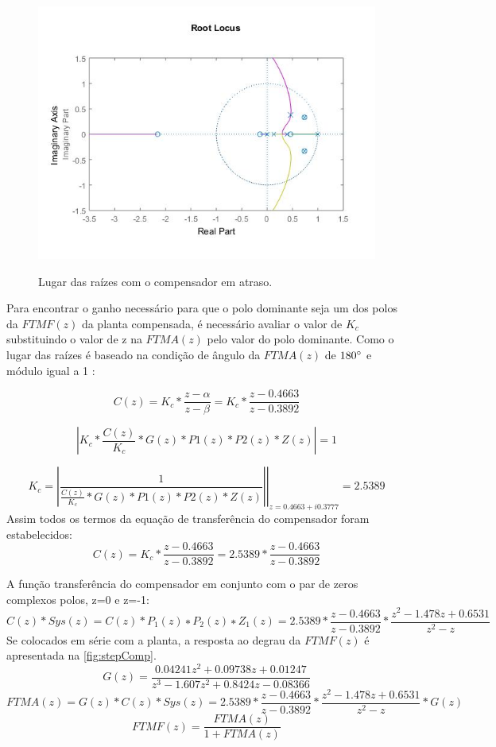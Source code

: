 \documentclass[
	article,			%
	11pt,				%
	oneside,			%
	a4paper,			%
	english,			%
	brazil,				%
	sumario=tradicional
	]{abntex2}
\begin{document}
\begin{figure}[htb!]
	\centering
	\caption{Lugar das raízes com o compensador em atraso.}
	\includegraphics[scale=0.8]{./img/rlocus_compensado.JPG}
	\label{fig:rlocus_compensado}
\end{figure}

Para encontrar o ganho necessário para que o polo dominante seja um dos polos da $FTMF(z)$ da planta compensada, é necessário avaliar o valor de $K_c$ substituindo o valor de z na $FTMA(z)$ pelo valor do polo dominante.
Como o lugar das raízes é baseado na condição de ângulo da $FTMA(z)$ de $180\degree$ e módulo igual a 1 \cite{Ogata2014}:

$$
	C(z) = K_c * \frac{z - \alpha}{z - \beta} = K_c * \frac{z - 0.4663}{z - 0.3892} 
$$

$$
|K_c*\frac{C(z)}{K_c}*G(z)*P1(z)*P2(z)*Z(z)|=1
$$

$$
    K_c  = \left. |\frac{1}{\frac{C(z)}{K_c}*G(z)*P1(z)*P2(z)*Z(z)}| \right\rvert_{z = 0.4663+i0.3777}  = 2.5389
$$
Assim todos os termos da equação de transferência do compensador foram estabelecidos:
$$
	C(z) = K_c * \frac{z - 0.4663}{z - 0.3892}  = 2.5389 * \frac{z - 0.4663}{z - 0.3892}  
$$

\pagebreak

A função transferência do compensador em conjunto com o par de zeros complexos polos, z=0 e z=-1:
$$
    C(z)*Sys(z) = C(z)*P_1(z)∗P_2(z)∗Z_1(z) =2.5389 * \frac{z - 0.4663}{z - 0.3892} *\frac{z^2 - 1.478z + 0.6531}{z^2 - z}
$$
Se colocados em série com a planta, a resposta ao degrau da $FTMF(z)$ é apresentada na \autoref{fig:stepComp}.
$$
    G(z) =\frac{0.04241z^2 + 0.09738z + 0.01247}{z^3 - 1.607z^2 + 0.8424z - 0.08366}
$$
$$
    FTMA(z) = G(z)*C(z)*Sys(z) =2.5389 * \frac{z - 0.4663}{z - 0.3892} *\frac{z^2 - 1.478z + 0.6531}{z^2 - z}*G(z)
$$
$$
    FTMF(z) = \frac{FTMA(z)}{1 + FTMA(z)}
$$
\end{document}
